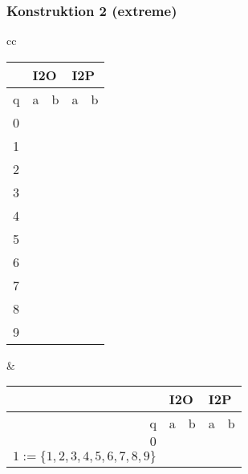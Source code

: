 \begin{frame}
  \frametitle{Konstruktion 2 (extreme)}
  \centering
  \begin{tabular}{cc}
    \begin{tabular}{|l|l|l|l|l|}
      \hline
      & \multicolumn{2}{l|}{I2O} & \multicolumn{2}{l|}{I2P} \\\hline
    q & a           & b          & a           & b          \\\hline\hline
    0  &             &            &             &            \\\hline
    \cellcolor[HTML]{DAE8FC}1 &             &            &             &            \\\hline
    \cellcolor[HTML]{DAE8FC}2 &             &            &             &            \\\hline
    \cellcolor[HTML]{DAE8FC}3 &             &            &             &            \\\hline
    \cellcolor[HTML]{DAE8FC}4 &             &            &             &            \\\hline
    \cellcolor[HTML]{DAE8FC}5 &             &            &             &            \\\hline
    \cellcolor[HTML]{DAE8FC}6 &             &            &             &            \\\hline
    \cellcolor[HTML]{DAE8FC}7 &             &            &             &            \\\hline
    \cellcolor[HTML]{DAE8FC}8 &             &            &             &            \\\hline
    \cellcolor[HTML]{DAE8FC}9 &             &            &             &           \\\hline
    \end{tabular}
    &
    \begin{tabular}{|r|r|r|r|r|}
      \hline
      & \multicolumn{2}{l|}{I2O} & \multicolumn{2}{l|}{I2P} \\\hline
    q & a           & b          & a           & b          \\\hline\hline
    \cellcolor[HTML]{DAE8FC}$0$  &             &            &             &            \\\hline
    $1:=\{1,2,3,4,5,6,7,8,9\}$ &             &            &             &            \\\hline
    \end{tabular}
    \end{tabular}
\end{frame}

